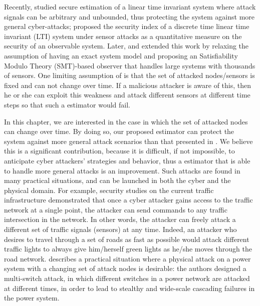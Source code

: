 \documentclass[../../thesis.tex]{subfiles}
\begin{document}
Recently, \cite{Fawzi:2014} studied secure estimation of a linear time invariant system where attack signals can be arbitrary and unbounded, thus protecting the system against more general cyber-attacks; \cite{chong2016characterising} proposed the security index of a discrete time linear time invariant (LTI) system under sensor attacks as a quantitative measure on the security of an observable system.
Later, \cite{Pajic:2014} and \cite{shoukry2016smt} extended this work by relaxing the assumption of having an exact system model and proposing an Satisfiability Modulo Theory (SMT)-based observer that handles large systems with thousands of sensors. One limiting assumption of \cite{Fawzi:2014} \cite{Pajic:2014} \cite{shoukry2016smt} is that the set of attacked nodes/sensors is fixed and can not change over time. If a malicious attacker is aware of this, then he or she can exploit this weakness and attack different sensors at different time steps so that such a estimator would fail.

In this chapter, we are interested in the case in which the set of attacked nodes can change over time. By doing so, our proposed estimator can protect the system against more general attack scenarios than that presented in \cite{Fawzi:2014}. We believe this is a significant contribution, because it is difficult, if not impossible, to anticipate cyber attackers' strategies and behavior, thus a estimator that is able to handle more general attacks is an improvement. 
Such attacks are found in many practical situations, and can be launched in both the cyber and the physical domain.
For example, security studies on the current traffic infrastructure \cite{ghena2014traffic} demonstrated that once a cyber attacker gains access to the traffic network at a single point, the attacker can send commands to any traffic intersection in the network. In other words, the attacker can freely attack a different set of traffic signals (sensors) at any time. Indeed, an attacker who desires to travel through a set of roads as fast as possible would attack different traffic lights to always give him/herself green lights as he/she moves through the road network. 
\cite{liu2014coordinated} describes a practical situation where a physical attack on a power system with a changing set of attack nodes is desirable: the authors designed a multi-switch attack, in which different switches in a power network are attacked at different times, in order to lead to stealthy and wide-scale cascading failures in the power system.
\end{document}
